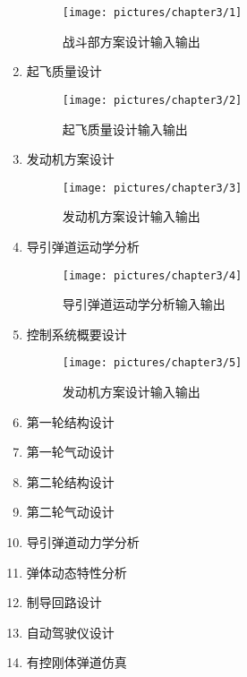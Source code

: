 \begin{enumerate}[1.]
\begin{figure}[h]
    \centering
    \texttt{[image: pictures/chapter3/1]}
    \caption{战斗部方案设计输入输出}
    \label{wall_part}
\end{figure}
\item 起飞质量设计
    
\begin{figure}[h]
    \centering
    \texttt{[image: pictures/chapter3/2]}
    \caption{起飞质量设计输入输出}
    \label{wall_part}
\end{figure}
\item 发动机方案设计

\begin{figure}[h]
    \centering
    \texttt{[image: pictures/chapter3/3]}
    \caption{发动机方案设计输入输出}
    \label{wall_part}
\end{figure}
\item 导引弹道运动学分析

\begin{figure}[h]
    \centering
    \texttt{[image: pictures/chapter3/4]}
    \caption{导引弹道运动学分析输入输出}
    \label{wall_part}
\end{figure}
\item 控制系统概要设计

\begin{figure}[h]
    \centering
    \texttt{[image: pictures/chapter3/5]}
    \caption{发动机方案设计输入输出}
    \label{wall_part}
\end{figure}
\item 第一轮结构设计
\item 第一轮气动设计
\item 第二轮结构设计
\item 第二轮气动设计
\item 导引弹道动力学分析
\item 弹体动态特性分析
\item 制导回路设计
\item 自动驾驶仪设计
\item 有控刚体弹道仿真

\end{enumerate}

